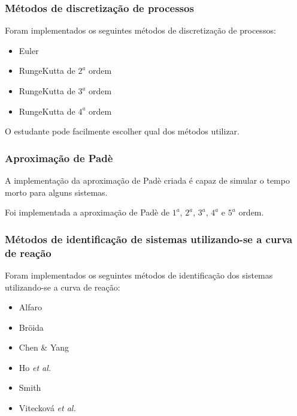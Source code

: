         \subsubsection{Métodos de discretização de processos}

            Foram implementados os seguintes métodos de discretização de processos:

            \begin{itemize}
                \item Euler
                \item RungeKutta de $2^a$ ordem
                \item RungeKutta de $3^a$ ordem
                \item RungeKutta de $4^a$ ordem
            \end{itemize}

            O estudante pode facilmente escolher qual dos métodos utilizar.

        \subsubsection{Aproximação de Padè}
            
            A implementação da aproximação de Padè criada é capaz de simular o tempo morto
            para alguns sistemas.

            Foi implementada a aproximação de Padè de $1^a$, $2^a$, $3^a$, $4^a$ e $5^a$ ordem.

        \subsubsection{Métodos de identificação de sistemas utilizando-se a curva de reação}
            
            Foram implementados os seguintes métodos de identificação dos sistemas utilizando-se
            a curva de reação:

            \begin{itemize}
                \item Alfaro
                \item Bröida
                \item Chen \& Yang
                \item Ho \textit{et al.}
                \item Smith
                \item Vitecková \textit{et al.}
            \end{itemize}

